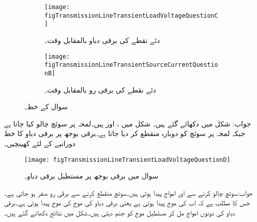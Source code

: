 \begin{figure}
\centering
\begin{subfigure}{0.9\textwidth}
\centering
\texttt{[image: figTransmissionLineTransientLoadVoltageQuestionC]}
\caption{ دئے نقطے کی برقی دباو بالمقابل وقت۔}
\label{شکل_ترسیلی_جواب_سوال_پ}
\end{subfigure}%

\begin{subfigure}{0.9\textwidth}
\centering
\texttt{[image: figTransmissionLineTransientSourceCurrentQuestionB]}
\caption{دئے نقطے کی برقی رو بالمقابل وقت۔}
\label{شکل_ترسیلی_جواب_منبع_رو_سوال_پ}
\end{subfigure}%
\caption{سوال  کے خط۔}
\label{شکل_سوال_ترسیلی_سوال_پ}
\end{figure}
جواب: شکل   میں دکھائے گئے ہیں۔
شکل   میں  ،  اور  ہیں۔لمحہ  پر سوئچ چالو کیا جاتا ہے جبکہ لمحہ  پر سوئچ کو دوبارہ منقطع کر دیا جاتا ہے۔برقی بوجھ پر برقی دباو کا خط  دورانیے کے لئے کھینچیں۔
\begin{figure}
\centering
\texttt{[image: figTransmissionLineTransientLoadVoltageQuestionD]}
\caption{سوال  میں برقی بوجھ پر مستطیل برقی دباو۔}
\label{شکل_ترسیلی_سوال_مستطیل_دباو}
\end{figure}

جواب:سوئچ چالو کرنے سے  اور  امواج پیدا ہوتی ہیں۔سوئچ منقطع کرنے سے برقی رو صفر ہو جاتی ہے۔جس کا مطلب ہے کہ اب  کی موج پیدا ہوئی ہے یعنی برقی دباو کی موج  کی موج پیدا ہوئی ہے۔برقی دباو کی دونوں امواج مل کر مستطیل موج کو جنم دیتی ہیں۔شکل  میں نتائج دکھائے گئے ہیں۔
